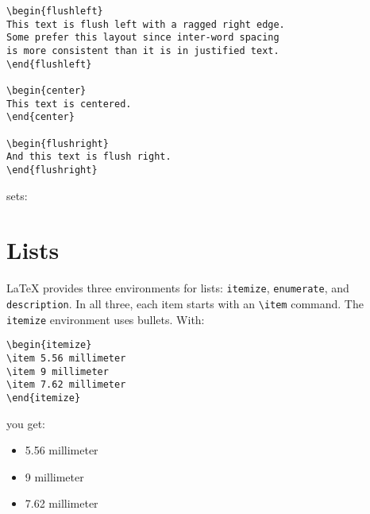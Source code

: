 \begin{leftfigure}
\begin{lstlisting}
\begin{flushleft}
This text is flush left with a ragged right edge.
Some prefer this layout since inter-word spacing
is more consistent than it is in justified text.
\end{flushleft}

\begin{center}
This text is centered.
\end{center}

\begin{flushright}
And this text is flush right.
\end{flushright}
\end{lstlisting}
\end{leftfigure}
sets:
\begin{leftfigure}
\end{leftfigure}

\section{Lists}

\LaTeX{} provides three environments for lists:
\texttt{itemize}, \texttt{enumerate}, and \texttt{description}.
In all three, each item starts with an \verb|\item| command.
The \texttt{itemize} environment uses bullets.
With:
\begin{leftfigure}
\begin{lstlisting}
\begin{itemize}
\item 5.56 millimeter
\item 9 millimeter
\item 7.62 millimeter
\end{itemize}
\end{lstlisting}
\end{leftfigure}
you get:
\begin{leftfigure}
\lm%
\begin{itemize}[leftmargin=*]
\item 5.56 millimeter
\item 9 millimeter
\item 7.62 millimeter
\end{itemize}
\end{leftfigure}

